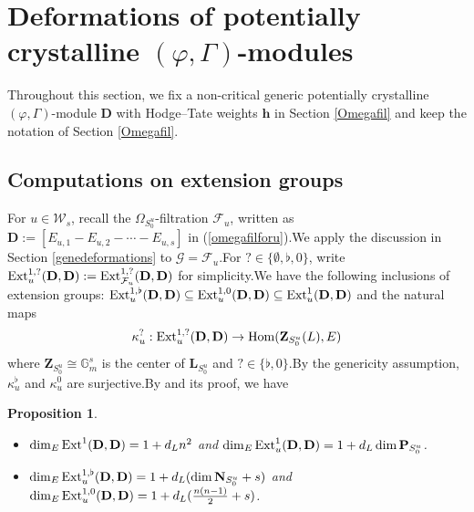 \documentclass[10pt]{article}
\newtheorem{pro}[thm]{Proposition}
\newcommand{\homo}{{\rm Hom}}
\newcommand{\ext}{{\rm Ext}}
\newcommand{\Dpik}{{\mathbf{D}}}
\newcommand{\omepik}{\Omega_{S^u_0}}
\newcommand{\BG}{{\mathbb{G}}}
\newcommand{\bL}{{\mathbf{L}}}
\newcommand{\bN}{{\mathbf{N}}}
\newcommand{\bP}{{\mathbf{P}}}
\newcommand{\bZ}{{\mathbf{Z}}}
\newcommand{\bh}{{\mathbf{h}}}
\newcommand{\cF}{\mathcal F}
\newcommand{\cG}{\mathcal G}
\newcommand{\sW}{\mathscr W}
\begin{document}
\section{Deformations of potentially crystalline $(\varphi,\Gamma)$-modules}

Throughout this section, we fix a non-critical generic potentially crystalline $(\varphi,\Gamma)$-module $\Dpik$ with Hodge--Tate weights $\bh$ in Section \ref{Omegafil}  and keep the notation of Section \ref{Omegafil}.\;





\subsection{Computations on extension groups}




For $u\in\sW_s$, recall the $\omepik$-filtration $\cF_{u}$, written as $\Dpik:=[E_{u,1}-E_{u,2}-\cdots-E_{u,s}]$ in (\ref{omegafilforu}).\;We apply the discussion in Section \ref{genedeformations} to $\cG=\cF_{u}$.\;For $?\in\{\emptyset,\flat,0\}$, write $\ext^{1,?}_{u}(\Dpik,\Dpik):=\ext^{1,?}_{\cF_{u}}(\Dpik,\Dpik)$ for simplicity.\;We have the following inclusions of extension groups:
$\ext^{1,\flat}_{u}(\Dpik,\Dpik)\subseteq\ext^{1,0}_{u}(\Dpik,\Dpik)\subseteq \ext^{1}_{u}(\Dpik,\Dpik)$ and the natural maps
\begin{equation}
	\begin{aligned}
		\kappa^{?}_{u}:\ext^{1,?}_{u}(\Dpik,\Dpik)\rightarrow\homo(\bZ_{S^u_0}(L),E)
		\end{aligned}
\end{equation}
where $\bZ_{S^u_0}\cong \BG_m^s$ is the center of $\bL_{S^u_0}$ and $?\in\{\flat,0\}$.\;By the genericity assumption, $\kappa^{\flat}_{u}$ and $\kappa^{0}_{u}$ are surjective.\;By \cite[Proposition 4.1.17,\;Corollary 4.1.8]{Ding2021} and its proof, we have
\begin{pro}\label{dimesionforParafilgeneric}
\begin{itemize}
	\item[(1)] $\dim_E\ext^1(\Dpik,\Dpik)=1+d_Ln^2$ and $\dim_E\ext^1_u(\Dpik,\Dpik)=1+d_L\dim \bP_{S^u_0}$.\; 
	\item[(2)]  $\dim_E\ext^{1,\flat}_{u}(\Dpik,\Dpik)=1+d_L(\dim\bN_{S^u_0}+s) $ and $\dim_E\ext^{1,0}_{u}(\Dpik,\Dpik)=1+d_L(\frac{n(n-1)}{2}+s)$.\;
\end{itemize}
\end{pro}	
\end{document}
